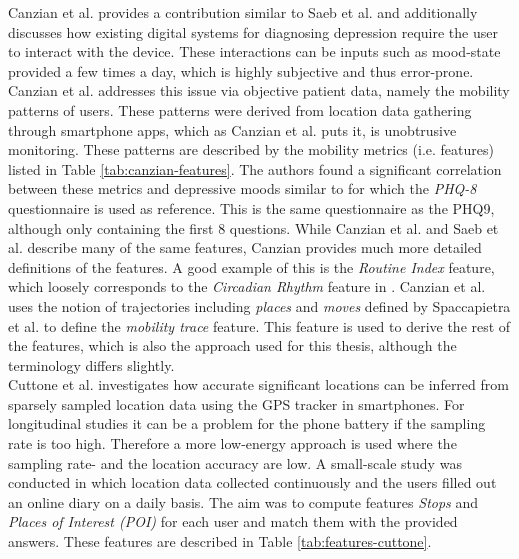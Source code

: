 Canzian et al. provides a contribution similar to Saeb et al. and additionally discusses how existing digital systems for diagnosing depression require the user to interact with the device. These interactions can be inputs such as mood-state provided a few times a day, which is highly subjective and thus error-prone. Canzian et al. addresses this issue via objective patient data, namely the mobility patterns of users. These patterns were derived from location data gathering through smartphone apps, which as Canzian et al. puts it, is unobtrusive monitoring. These patterns are described by the mobility metrics (i.e. features) listed in Table \ref{tab:canzian-features}. The authors found a significant correlation between these metrics and depressive moods similar to \cite{Saeb2015} for which the \textit{PHQ-8} questionnaire is used as  reference. This is the same questionnaire as the PHQ9, although only containing the first 8 questions. While Canzian et al. and Saeb et al. describe many of the same features, Canzian provides much more detailed definitions of the features. A good example of this is the \textit{Routine Index} feature, which loosely corresponds to the \textit{Circadian Rhythm} feature in \cite{Saeb2015}. Canzian et al. \cite{Canzian2015} uses the notion of trajectories including \textit{places} and \textit{moves} defined by Spaccapietra et al. \cite{trajectories2008} to define the \textit{mobility trace} feature. This feature is used to derive the rest of the features, which is also the approach used for this thesis, although the terminology differs slightly.\\




Cuttone et al. \cite{sparse-location-2014} investigates how accurate significant locations can be inferred from sparsely sampled location data using the GPS tracker in smartphones. For longitudinal studies it can be a problem for the phone battery if the sampling rate is too high. Therefore a more low-energy approach is used where the sampling rate- and the location accuracy are low. A small-scale study was conducted in which location data collected continuously and the users filled out an online diary on a daily basis. The aim was to compute features \textit{Stops} and \textit{Places of Interest (POI)} for each user and match them with the provided answers. These features are described in Table \ref{tab:features-cuttone}. \\

